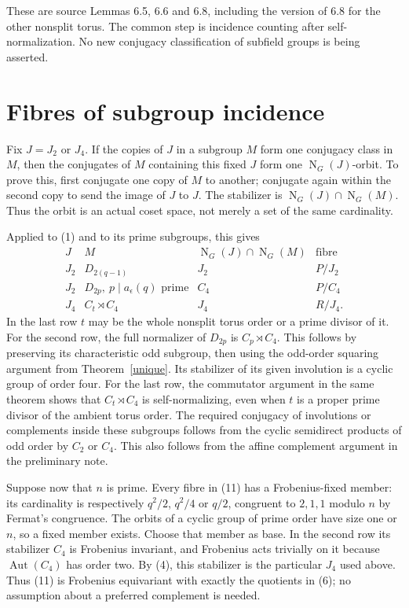 \documentclass[11pt,a4paper]{article}
\newcommand{\Aut}{\operatorname{Aut}}
\newcommand{\N}{\operatorname{N}}
\begin{document}
These are source Lemmas 6.5, 6.6 and 6.8, including the version
of 6.8 for the other nonsplit torus. The common step is incidence
counting after self-normalization. No new conjugacy classification
of subfield groups is being asserted.

\section{Fibres of subgroup incidence}
Fix $J=J_2$ or $J_4$. If the copies of $J$ in a subgroup $M$ form
one conjugacy class in $M$, then the conjugates of $M$ containing
this fixed $J$ form one $\N_G(J)$-orbit. To prove this, first
conjugate one copy of $M$ to another; conjugate again within the
second copy to send the image of $J$ to $J$. The stabilizer is
$\N_G(J)\cap\N_G(M)$. Thus the orbit is an actual coset space,
not merely a set of the same cardinality.

Applied to (1) and to its prime subgroups, this gives
\[
\begin{array}{c|c|c|c}
 J&M&\N_G(J)\cap\N_G(M)&\text{fibre}\\\hline
 J_2&D_{2(q-1)}&J_2&P/J_2\\
 J_2&D_{2p},\ p\mid a_\epsilon(q)\text{ prime}&C_4&P/C_4\\
 J_4&C_t\rtimes C_4&J_4&R/J_4.
\end{array}                                               \tag{11}
\]
In the last row $t$ may be the whole nonsplit torus order or a
prime divisor of it. For the second row, the full normalizer of
$D_{2p}$ is $C_p\rtimes C_4$. This follows by preserving its
characteristic odd subgroup, then using the odd-order squaring
argument from Theorem~\ref{unique}. Its stabilizer of its given
involution is a cyclic group of order four. For the last row,
the commutator argument in the same theorem shows that
$C_t\rtimes C_4$ is self-normalizing, even when $t$ is a proper
prime divisor of the ambient torus order. The required conjugacy
of involutions or complements inside these subgroups follows
from the cyclic semidirect products of odd order by $C_2$ or
$C_4$. This also follows from the affine complement argument
in the preliminary note.

Suppose now that $n$ is prime. Every fibre in (11) has a
Frobenius-fixed member: its cardinality is respectively $q^2/2$,
$q^2/4$ or $q/2$, congruent to $2,1,1$ modulo $n$ by Fermat's
congruence. The orbits of a cyclic group of prime order have size
one or $n$, so a fixed member exists. Choose that member as base.
In the second row its stabilizer $C_4$ is Frobenius invariant,
and Frobenius acts trivially on it because $\Aut(C_4)$ has order
two. By (4), this stabilizer is the particular $J_4$ used above.
Thus (11) is Frobenius equivariant with exactly the quotients
in (6); no assumption about a preferred complement is needed.
\end{document}
